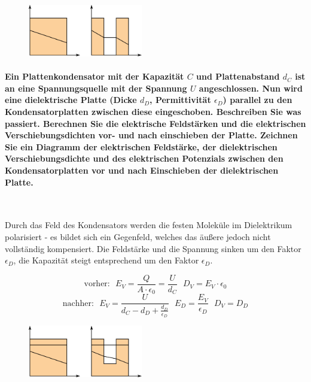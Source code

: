 \documentclass[a4paper, 11pt, ngerman, parskip=half-]{scrartcl}
\begin{document}
\begin{figure}[H]
    \centering
    \includegraphics[width=5cm]{image/02/3}
\end{figure}

\paragraph{Ein Plattenkondensator mit der Kapazität $C$ und Plattenabstand $d_C$ ist an eine
    Spannungsquelle mit der Spannung $U$ angeschlossen. Nun wird eine dielektrische Platte (Dicke $d_D$,
    Permittivität $\epsilon_D$) parallel zu den Kondensatorplatten zwischen diese eingeschoben.
    Beschreiben Sie was passiert. Berechnen Sie die elektrische Feldstärken und die elektrischen
    Verschiebungsdichten vor- und nach einschieben der Platte. Zeichnen Sie ein Diagramm der
    elektrischen Feldstärke, der dielektrischen Verschiebungsdichte und des elektrischen Potenzials
    zwischen den Kondensatorplatten vor und nach Einschieben der dielektrischen Platte.} ~

Durch das Feld des Kondensators werden die festen Moleküle im Dielektrikum polarisiert - es bildet
sich ein Gegenfeld, welches das äußere jedoch nicht vollständig kompensiert. Die Feldstärke und die
Spannung sinken um den Faktor $\epsilon_D$, die Kapazität steigt entsprechend um den Faktor
$\epsilon_D$.

\begin{equation}
    \text{vorher:} ~~~
    E_V = \frac{Q}{A \cdot \epsilon_0} = \frac{U}{d_C} ~~~
    D_V = E_V \cdot \epsilon_0
\end{equation}
\begin{equation}
    \text{nachher:} ~~~
    E_V = \frac{U}{d_C - d_D + \frac{d_D}{\epsilon_D}} ~~~
    E_D = \frac{E_V}{\epsilon_D} ~~~
    D_V = D_D
\end{equation}

\begin{figure}[H]
    \centering
    \includegraphics[width=5cm]{image/02/4}
\end{figure}
\end{document}
